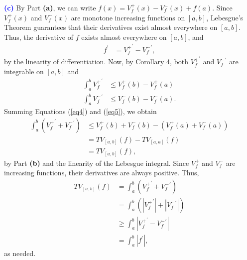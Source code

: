 \documentclass[12pt]{article}
\begin{document}
\vspace{5mm}

\noindent\textcolor{blue}{\textbf{(c)}} By Part \textbf{(a)}, we can write $f(x) = V_f^+(x) - V_f^-(x) + f(a).$ Since $V_f^+(x)$ and $V_f^-(x)$ are monotone increasing functions on $[a,b]$, Lebesgue's Theorem guarantees that their derivatives exist almost everywhere on $[a,b]$. Thus, the derivative of $f$ exists almost everywhere on $[a,b]$, and
\begin{align}
    f^{\prime} &= {V_f^+}^{\prime} - {V_f^-}^{\prime},
\end{align}
by the linearity of differentiation. Now, by Corollary 4, both ${V_f^+}^{\prime}$ and ${V_f^-}^{\prime}$ are integrable on $[a,b]$ and
\begin{align}
\int_a^b {V_f^+}^{\prime} &\leq V_f^+(b) - V_f^+(a) \label{eq4} \\
\int_a^b {V_f^-}^{\prime} &\leq V_f^-(b) - V_f^-(a). \label{eq5}
\end{align}
Summing Equations (\ref{eq4}) and (\ref{eq5}), we obtain 
\begin{align}
    \int_a^b \left({V_f^+}^{\prime} + {V_f^-}^{\prime}\right) &\leq V_f^+(b) + V_f^-(b) - \left(V_f^+(a) + V_f^-(a)\right) \\
    &= TV_{[a,b]}(f) - TV_{[a,a]}(f) \\
    &= TV_{[a,b]}(f),
\end{align}
by Part \textbf{(b)} and the linearity of the Lebesgue integral. Since $V_f^+$ and $V_f^-$ are increasing functions, their derivatives are always positive. Thus,
\begin{align}
    TV_{[a,b]}(f) &=  \int_a^b \left({V_f^+}^{\prime} + {V_f^-}^{\prime}\right) \\&=  \int_a^b \left(\left|{V_f^+}^{\prime}\right| + \left|{V_f^-}^{\prime}\right|\right) \\
    &\geq  \int_a^b \left|{V_f^+}^{\prime} - {V_f^-}^{\prime}\right| \\
    &= \int_a^b \left|f^{\prime}\right|,
\end{align}
as needed.

\vspace{5mm}
\end{document}
